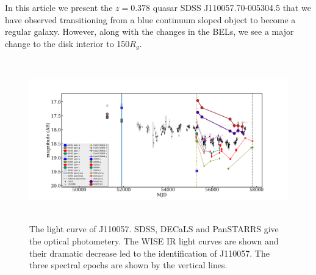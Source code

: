 \documentclass{nature}
\begin{document}
In this article we present the $z=0.378$ quasar SDSS
J110057.70-005304.5 that we have observed transitioning from a blue
continuum sloped object to become a regular galaxy. However, along
with the changes in the BELs, we see a major change to the disk
interior to 150$R_{g}$.
 
\begin{figure}
  \centering
  \includegraphics[width=16.00cm, height=7.00cm, trim=0.0cm 0.0cm 0.0cm 0.0cm, clip]
  {../plots/lc/J110057_lc_20171006v1.pdf}
  \caption[]{The light curve of J110057. SDSS, DECaLS and PanSTARRS
    give the optical photometery. The WISE IR light curves are shown and
    their dramatic decrease led to the identification of J110057. The
    three spectral epochs are shown by the vertical lines.}
  \label{fig:J110057_LC_CRTS}
\end{figure}
\end{document}
